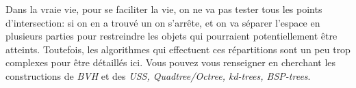 \documentclass{classe}
\begin{document}
Dans la vraie vie, pour se faciliter la vie, on ne va pas tester tous les points d'intersection: si on en a trouvé un on s'arrête, et on va séparer l'espace en plusieurs parties pour restreindre les objets qui pourraient potentiellement être atteints.
Toutefois, les algorithmes qui effectuent ces répartitions sont un peu trop complexes pour être détaillés ici.
Vous pouvez vous renseigner en cherchant les constructions de \emph{BVH} et des \emph{USS, Quadtree/Octree, kd-trees, BSP-trees}.
\end{document}
